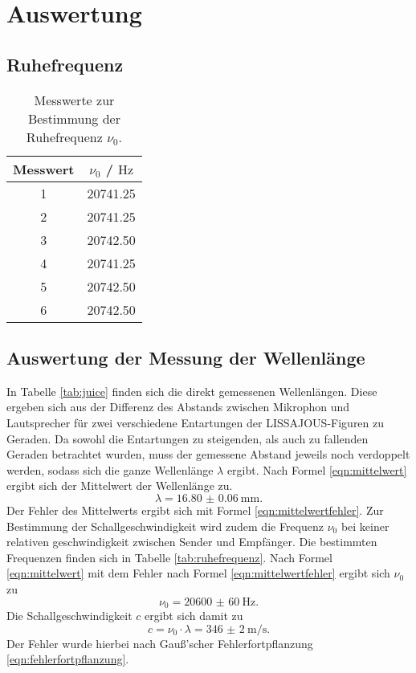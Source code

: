 \section{Auswertung}
\label{sec:Auswertung}
\FloatBarrier
\subsection{Ruhefrequenz}
\begin{table}
	\centering
	\caption{Messwerte zur Bestimmung der Ruhefrequenz $\nu_0$.}
	\label{tab:ruhefr}
	\begin{tabular}{cc}
		\toprule
		Messwert & $\nu_0$ / $\si{\hertz}$ \\
		\midrule
		1        & 20741.25                \\
		2        & 20741.25                \\
		3        & 20742.50                \\
		4        & 20741.25                \\
		5        & 20742.50                \\
		6        & 20742.50                \\
		\bottomrule
	\end{tabular}
\end{table}
\FloatBarrier
\subsection{Auswertung der Messung der Wellenlänge}
In Tabelle \ref{tab:juice} finden sich die direkt gemessenen Wellenlängen. Diese ergeben sich aus der Differenz des Abstands zwischen Mikrophon und Lautsprecher für zwei verschiedene Entartungen der LISSAJOUS-Figuren zu Geraden.
Da sowohl die Entartungen zu steigenden, als auch zu fallenden Geraden betrachtet wurden, muss der gemessene Abstand jeweils noch verdoppelt werden, sodass sich die ganze Wellenlänge $\lambda$ ergibt.
Nach Formel \eqref{eqn:mittelwert} ergibt sich der Mittelwert der Wellenlänge zu.
\begin{equation}
	\label{eqn:wellenlänge}
	\lambda=\SI{16.80(6)}{\milli\metre}\text{.}
\end{equation}
Der Fehler des Mittelwerts ergibt sich mit Formel \eqref{eqn:mittelwertfehler}.
Zur Bestimmung der Schallgeschwindigkeit wird zudem die Frequenz $\nu_{0}$ bei keiner relativen geschwindigkeit zwischen Sender und Empfänger.
Die bestimmten Frequenzen finden sich in Tabelle \ref{tab:ruhefrequenz}.
Nach Formel \eqref{eqn:mittelwert} mit dem Fehler nach Formel \eqref{eqn:mittelwertfehler} ergibt sich $\nu_0$ zu
\begin{equation}
	\label{eqn:rrrruhe}
	\nu_0=\SI{20600(60)}{\Hz}\text{.}
\end{equation}
Die Schallgeschwindigkeit $c$ ergibt sich damit zu
\begin{equation}
	\label{eqn:Schallgeschwindigkeit}
	c=\nu_0 \cdot\lambda=\SI{346(2)}{\meter\per\second}\text{.}
\end{equation}
Der Fehler wurde hierbei nach Gauß'scher Fehlerfortpflanzung \eqref{eqn:fehlerfortpflanzung}.

